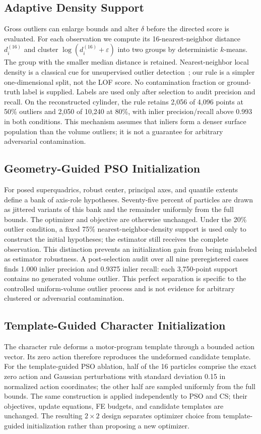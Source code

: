\documentclass[conference]{IEEEtran}
\begin{document}
\subsection{Adaptive Density Support}
Gross outliers can enlarge bounds and alter $\delta$ before the directed score
is evaluated.  For each observation we compute its 16-nearest-neighbor distance
$d_i^{(16)}$ and cluster $\log(d_i^{(16)}+\varepsilon)$ into two groups by
deterministic $k$-means.  The group with the smaller median distance is retained.
Nearest-neighbor local density is a classical cue for unsupervised outlier
detection~\cite{breunig2000lof}; our rule is a simpler one-dimensional split,
not the LOF score.
No contamination fraction or ground-truth label is supplied.  Labels are used
only after selection to audit precision and recall.  On the reconstructed
cylinder, the rule retains 2,056 of 4,096 points at 50\% outliers and 2,050 of
10,240 at 80\%, with inlier precision/recall above 0.993 in both conditions.
This mechanism assumes that inliers form a denser surface population than the
volume outliers; it is not a guarantee for arbitrary adversarial contamination.

\subsection{Geometry-Guided PSO Initialization}
For posed superquadrics, robust center, principal axes, and quantile extents
define a bank of axis-role hypotheses.  Seventy-five percent of particles are
drawn as jittered variants of this bank and the remainder uniformly from the
full bounds.  The optimizer and objective are otherwise unchanged.  Under the
20\% outlier condition, a fixed 75\% nearest-neighbor-density support is used
only to construct the initial hypotheses; the estimator still receives the
complete observation.  This distinction prevents an initialization gain from
being mislabeled as estimator robustness.  A post-selection audit over all
nine preregistered cases finds 1.000 inlier precision and 0.9375 inlier recall:
each 3,750-point support contains no generated volume outlier.  This perfect
separation is specific to the controlled uniform-volume outlier process and is
not evidence for arbitrary clustered or adversarial contamination.

\subsection{Template-Guided Character Initialization}
The character rule deforms a motor-program template through a bounded action
vector.  Its zero action therefore reproduces the undeformed candidate
template.  For the template-guided PSO ablation, half of the 16 particles
comprise the exact zero action and Gaussian perturbations with standard
deviation 0.15 in normalized action coordinates; the other half are sampled
uniformly from the full bounds.  The same construction is applied independently
to PSO and CS; their objectives, update equations, FE budgets, and candidate
templates are unchanged.  The resulting $2\times2$ design separates optimizer
choice from template-guided initialization rather than proposing a new
optimizer.
\end{document}
